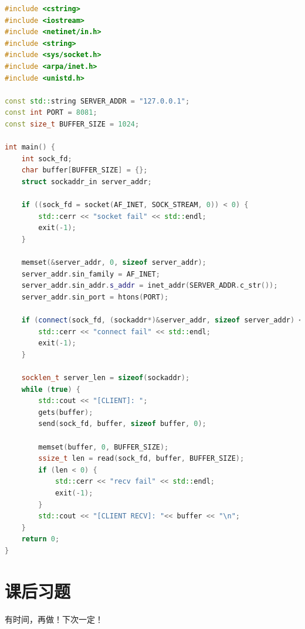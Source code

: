 \begin{lstlisting}[language=C++, caption={tcp client code}]
#include <cstring>
#include <iostream>
#include <netinet/in.h>
#include <string>
#include <sys/socket.h>
#include <arpa/inet.h>
#include <unistd.h>

const std::string SERVER_ADDR = "127.0.0.1";
const int PORT = 8081;
const size_t BUFFER_SIZE = 1024;

int main() {
    int sock_fd;
    char buffer[BUFFER_SIZE] = {};
    struct sockaddr_in server_addr;

    if ((sock_fd = socket(AF_INET, SOCK_STREAM, 0)) < 0) {
        std::cerr << "socket fail" << std::endl;
        exit(-1);
    }

    memset(&server_addr, 0, sizeof server_addr);
    server_addr.sin_family = AF_INET;
    server_addr.sin_addr.s_addr = inet_addr(SERVER_ADDR.c_str());
    server_addr.sin_port = htons(PORT);

    if (connect(sock_fd, (sockaddr*)&server_addr, sizeof server_addr) < 0) {
        std::cerr << "connect fail" << std::endl;
        exit(-1);
    }

    socklen_t server_len = sizeof(sockaddr);
    while (true) {
        std::cout << "[CLIENT]: ";
        gets(buffer);
        send(sock_fd, buffer, sizeof buffer, 0);

        memset(buffer, 0, BUFFER_SIZE);
        ssize_t len = read(sock_fd, buffer, BUFFER_SIZE);
        if (len < 0) {
            std::cerr << "recv fail" << std::endl;
            exit(-1);
        }
        std::cout << "[CLIENT RECV]: "<< buffer << "\n";
    }
    return 0;
}
\end{lstlisting}

\section{课后习题}

    有时间，再做！下次一定！